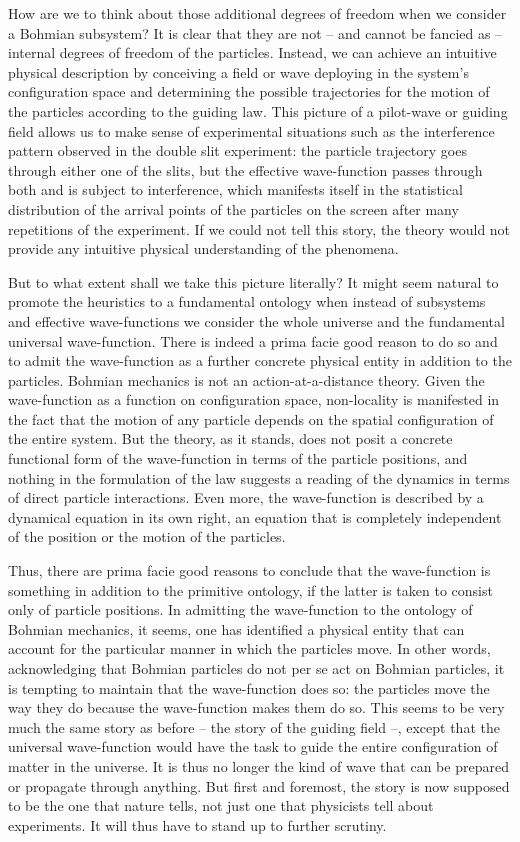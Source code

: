 \documentclass[12pt,a4paper]{article}
\theoremstyle{definition}
\begin{document}
How are we to think about those additional degrees of freedom when we consider a Bohmian subsystem? It is clear that they are not -- and cannot be fancied as -- internal degrees of freedom of the particles. Instead, we can achieve an intuitive physical description by conceiving a field or wave deploying in the system's configuration space and determining the possible trajectories for the motion of the particles according to the guiding law. This picture of a pilot-wave or guiding field allows us to make sense of experimental situations such as the interference pattern observed in the double slit experiment: the particle trajectory goes through either one of the slits, but the effective wave-function passes through both and is subject to interference, which manifests itself in the statistical distribution of the arrival points of the particles on the screen after many repetitions of the experiment. If we could not tell this story, the theory would not provide any intuitive physical understanding of the phenomena.

But to what extent shall we take this picture literally? It might seem natural to promote the heuristics to a fundamental ontology when instead of subsystems and effective wave-functions we consider the whole universe and the fundamental universal wave-function. There is indeed a prima facie good reason to do so and to admit the wave-function as a further concrete physical entity in addition to the particles. Bohmian mechanics is not an action-at-a-distance theory. Given the wave-function as a function on configuration space, non-locality is manifested in the fact that the motion of any particle depends on the spatial configuration of the entire system. But the theory, as it stands, does not posit a concrete functional form of the wave-function in terms of the particle positions, and nothing in the formulation of the law suggests a reading of the dynamics in terms of direct particle interactions. Even more, the wave-function is described by a dynamical equation in its own right, an equation that is completely independent of the position or the motion of the particles.

Thus, there are prima facie good reasons to conclude that the wave-function is something in addition to the primitive ontology, if the latter is taken to consist only of particle positions. In admitting the wave-function to the ontology of Bohmian mechanics, it seems, one has identified a physical entity that can account for the particular manner in which the particles move. In other words, acknowledging that Bohmian particles do not per se act on Bohmian particles, it is tempting to maintain that the wave-function does so: the particles move the way they do because the wave-function makes them do so. This seems to be very much the same story as before -- the story of the guiding field --, except that the universal wave-function would have the task to guide the entire configuration of matter in the universe. It is thus no longer the kind of wave that can be prepared or propagate through anything. But first and foremost, the story is now supposed to be the one that nature tells, not just one that physicists tell about experiments. It will thus have to stand up to further scrutiny.
\end{document}
